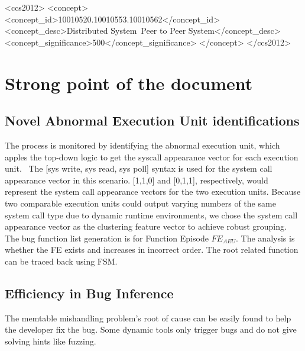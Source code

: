 \documentclass[acmlarge]{acmart}
\begin{document}
\begin{CCSXML}
  <ccs2012>
  <concept>
  <concept_id>10010520.10010553.10010562</concept_id>
  <concept_desc>Distributed System~Peer to Peer System</concept_desc>
  <concept_significance>500</concept_significance>
  </concept>
  </ccs2012>
\end{CCSXML}




\maketitle
\section{Strong point of the document}

\subsection{Novel Abnormal Execution Unit identifications}
The process is monitored by identifying the abnormal execution unit, which apples the top-down logic to get the syscall appearance vector for each execution unit.  The [sys write, sys read, sys poll] syntax is used for the system call appearance vector in this scenario. [1,1,0] and [0,1,1], respectively, would represent the system call appearance vectors for the two execution units. Because two comparable execution units could output varying numbers of the same system call type due to dynamic runtime environments, we chose the system call appearance vector as the clustering feature vector to achieve robust grouping. The bug function list generation is for Function Episode $FE_{AEU}$. The analysis is whether the FE exists and increases in incorrect order. The root related function can be traced back using FSM.
\subsection{Efficiency in Bug Inference}
The memtable mishandling problem's root of cause can be easily found to help the developer fix the bug. Some dynamic tools only trigger bugs and do not give solving hints like fuzzing.
\end{document}
